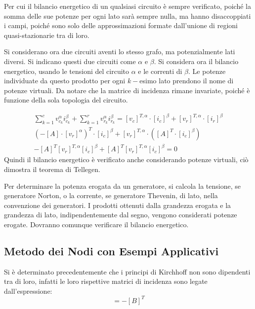 \documentclass{article}
\numberwithin{equation}{subsection}
\begin{document}
Per cui il bilancio energetico di un qualsiasi circuito è sempre verificato, poiché la somma delle sue potenze per ogni lato sarà sempre nulla, ma hanno disaccoppiati 
i campi, poiché sono solo delle approssimazioni formate dall'unione di regioni quasi-stazionarie tra di loro. 

Si considerano ora due circuiti aventi lo stesso grafo, ma potenzialmente lati diversi. Si indicano questi due circuiti come $\alpha$ e $\beta$. Si considera ora il 
bilancio energetico, usando le tensioni del circuito $\alpha$ e le correnti di $\beta$. Le potenze individuate da questo prodotto per ogni $k-$esimo lato prendono il nome 
di potenze virtuali. Da notare che la matrice di incidenza rimane invariate, poiché è funzione della sola topologia del circuito. 

\begin{gather*}
    \displaystyle\sum_{k=1}^cv_{c_k}^\alpha i_{c_k}^\beta+\sum_{k=1}^rv_{r_k}^\alpha i_{r_k}^\beta=[v_c]^{T,\alpha}\cdot[i_c]^\beta+[v_r]^{T,\alpha}\cdot[i_r]^\beta\\
    \left(-[A]\cdot[v_r]^\alpha\right)^T\cdot[i_c]^\beta+[v_r]^{T,\alpha}\cdot\left([A]^T\cdot[i_c]^\beta\right)\\
    -[A]^T[v_r]^{T,\alpha}[i_c]^\beta+[A]^T[v_r]^{T,\alpha}[i_c]^\beta=0
\end{gather*}
Quindi il bilancio energetico è verificato anche considerando potenze virtuali, ciò dimostra il teorema di Tellegen. 


Per determinare la potenza erogata da un generatore, si calcola la tensione, se generatore Norton, o la corrente, se generatore Thevenin, di lato, nella convenzione dei 
generatori. I prodotti ottenuti dalla grandezza erogata e la grandezza di lato, indipendentemente dal segno, vengono considerati potenze erogate. Dovranno comunque 
verificare il bilancio energetico. 

%

\subsection{Metodo dei Nodi con Esempi Applicativi}

Si è determinato precedentemente che i principi di Kirchhoff non sono dipendenti tra di loro, infatti le loro rispettive matrici di incidenza sono legate dall'espressione:
\begin{equation*}
    [A]=-[B]^T
\end{equation*}
\end{document}
